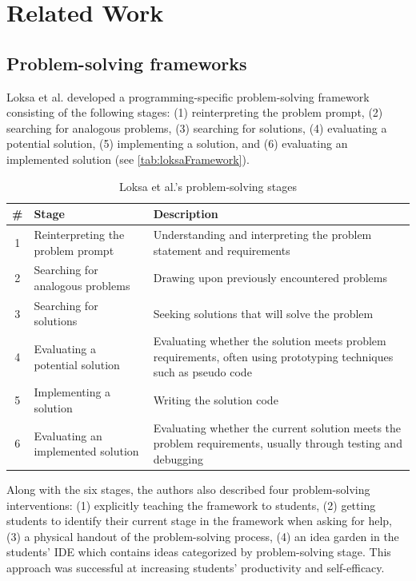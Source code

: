 \documentclass[sigconf,anonymous]{acmart}
\begin{document}
\section{Related Work} \label{sec:relatedwork}

\subsection{Problem-solving frameworks} \label{sec:relatedwork-frameworks}
Loksa et al. \cite{loksa20162} developed a programming-specific problem-solving framework consisting of the following stages: (1) reinterpreting the problem prompt, (2) searching for analogous problems, (3) searching for solutions, (4) evaluating a potential solution, (5) implementing a solution, and (6) evaluating an implemented solution (see \autoref{tab:loksaFramework}).

\begin{table}
  \caption{Loksa et al.'s problem-solving stages \cite{loksa20162}}
  \label{tab:loksaFramework}
  \begin{tabular}{c|p{35mm}|p{35mm}}
    \toprule
    \#&Stage&Description\\
    \midrule
    1&Reinterpreting the problem prompt&Understanding and interpreting the problem statement and requirements\\
    \midrule
    2&Searching for analogous problems&Drawing upon previously encountered problems \\
    \midrule
    3&Searching for solutions&Seeking solutions that will solve the problem\\
    \midrule
    4&Evaluating a potential solution&Evaluating whether the solution meets problem requirements, often using prototyping techniques such as pseudo code\\
    \midrule
    5&Implementing a solution&Writing the solution code \\
    \midrule
    6&Evaluating an implemented solution&Evaluating whether the current solution meets the problem requirements, usually through testing and debugging\\
    \bottomrule
  \end{tabular}
\end{table}

Along with the six stages, the authors also described four problem-solving interventions: (1) explicitly teaching the framework to students, (2) getting students to identify their current stage in the framework when asking for help, (3) a physical handout of the problem-solving process, (4) an idea garden in the students' IDE which contains ideas categorized by problem-solving stage. This approach was successful at increasing students' productivity and self-efficacy.
\end{document}
